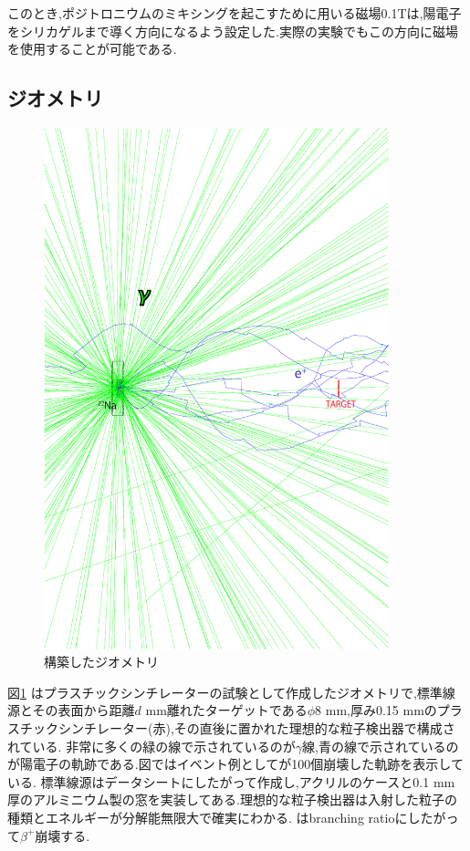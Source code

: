 このとき,ポジトロニウムのミキシングを起こすために用いる磁場0.1Tは,陽電子をシリカゲルまで導く方向になるよう設定した.実際の実験でもこの方向に磁場を使用することが可能である.

\subsection{ジオメトリ}

\begin{figure}[htbp]
	\centering
		\includegraphics[width=10cm]{img/test1_geometry.pdf}
	\caption{構築したジオメトリ}
	\label{test1_geometry}
\end{figure}

図\ref{test1_geometry} はプラスチックシンチレーターの試験として作成したジオメトリで,標準線源とその表面から距離$d$ mm離れたターゲットである$\phi8$ mm,厚み0.15 mmのプラスチックシンチレーター(赤),その直後に置かれた理想的な粒子検出器で構成されている.
非常に多くの緑の線で示されているのが$\gamma$線,青の線で示されているのが陽電子の軌跡である.図ではイベント例としてが100個崩壊した軌跡を表示している.
標準線源はデータシートにしたがって作成し,アクリルのケースと0.1 mm厚のアルミニウム製の窓を実装してある.理想的な粒子検出器は入射した粒子の種類とエネルギーが分解能無限大で確実にわかる.
はbranching ratioにしたがって$\beta^+$崩壊する.

